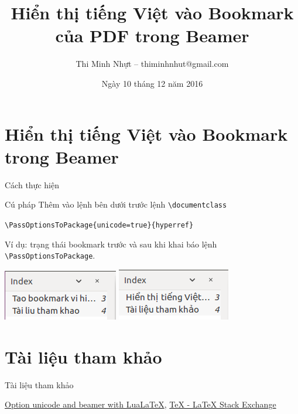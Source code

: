 \documentclass[17pt]{beamer}
\author[Thi Minh Nhựt]{Thi Minh Nhựt -- thiminhnhut@gmail.com}
\title[Tiếng Việt trong Bookmark]{Hiển thị tiếng Việt vào Bookmark của PDF trong Beamer}
\date[Cần Thơ, 2016]{Ngày 10 tháng 12 năm 2016}
\begin{document}
\begin{frame}
\titlepage
\end{frame}

\begin{frame}
\tableofcontents
\end{frame}

\section{Hiển thị tiếng Việt vào Bookmark trong Beamer}
\begin{frame}[fragile]{Cách thực hiện}
	\begin{block}{Cú pháp}
		Thêm vào lệnh bên dưới trước lệnh \verb+\documentclass+
		
		\verb+\PassOptionsToPackage{unicode=true}{hyperref}+
	\end{block}
	
	Ví dụ: trạng thái bookmark trước và sau khi khai báo  lệnh \verb+\PassOptionsToPackage+.
	\begin{center}
			\includegraphics[scale=.61]{images/bookmark-khongtiengviet.png} \hspace{.2cm}
			\includegraphics[scale=.6]{images/bookmark-tiengviet.png} 
		\end{center}
\end{frame}

\section{Tài liệu tham khảo}
\begin{frame}{Tài liệu tham khảo}
	\begin{enumerate}[{[1]}]
		\justifying
		\item \href{http://tex.stackexchange.com/questions/308047/option-unicode-and-beamer-with-lualatex}{Option unicode and beamer with LuaLaTeX}, \href{http://tex.stackexchange.com/}{TeX - LaTeX Stack Exchange}
	\end{enumerate}
\end{frame}
\end{document}
